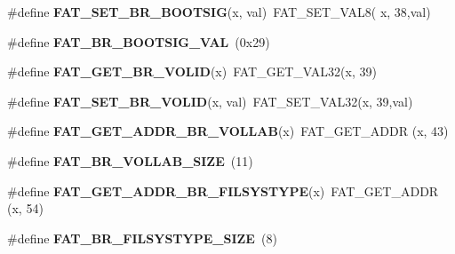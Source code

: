 \begin{DoxyCompactItemize}
\item 
\mbox{\label{group__libfs__dosfs_gab6f7a3cfb82931ecb008051dd56179cf}} 
\#define {\bfseries F\+A\+T\+\_\+\+S\+E\+T\+\_\+\+B\+R\+\_\+\+B\+O\+O\+T\+S\+IG}(x,  val)~F\+A\+T\+\_\+\+S\+E\+T\+\_\+\+V\+A\+L8( x, 38,val)
\item 
\mbox{\label{group__libfs__dosfs_ga1bab3d7f3ca1e4b75de0ccceb5ce33bd}} 
\#define {\bfseries F\+A\+T\+\_\+\+B\+R\+\_\+\+B\+O\+O\+T\+S\+I\+G\+\_\+\+V\+AL}~(0x29)
\item 
\mbox{\label{group__libfs__dosfs_ga62552b72a3937e82137c76fa6a480abf}} 
\#define {\bfseries F\+A\+T\+\_\+\+G\+E\+T\+\_\+\+B\+R\+\_\+\+V\+O\+L\+ID}(x)~F\+A\+T\+\_\+\+G\+E\+T\+\_\+\+V\+A\+L32(x, 39)
\item 
\mbox{\label{group__libfs__dosfs_gab1c126409acc4bde4cf1a77bc445432e}} 
\#define {\bfseries F\+A\+T\+\_\+\+S\+E\+T\+\_\+\+B\+R\+\_\+\+V\+O\+L\+ID}(x,  val)~F\+A\+T\+\_\+\+S\+E\+T\+\_\+\+V\+A\+L32(x, 39,val)
\item 
\mbox{\label{group__libfs__dosfs_ga47729ef14edf1445264f1ac10f80e4ef}} 
\#define {\bfseries F\+A\+T\+\_\+\+G\+E\+T\+\_\+\+A\+D\+D\+R\+\_\+\+B\+R\+\_\+\+V\+O\+L\+L\+AB}(x)~F\+A\+T\+\_\+\+G\+E\+T\+\_\+\+A\+D\+DR (x, 43)
\item 
\mbox{\label{group__libfs__dosfs_ga08748b874293e24d7b4645dc041b1263}} 
\#define {\bfseries F\+A\+T\+\_\+\+B\+R\+\_\+\+V\+O\+L\+L\+A\+B\+\_\+\+S\+I\+ZE}~(11)
\item 
\mbox{\label{group__libfs__dosfs_ga60eb7bc37b554a1e04988a89dea7168f}} 
\#define {\bfseries F\+A\+T\+\_\+\+G\+E\+T\+\_\+\+A\+D\+D\+R\+\_\+\+B\+R\+\_\+\+F\+I\+L\+S\+Y\+S\+T\+Y\+PE}(x)~F\+A\+T\+\_\+\+G\+E\+T\+\_\+\+A\+D\+DR (x, 54)
\item 
\mbox{\label{group__libfs__dosfs_ga3d0b6deb34097aa912637a4eead0bca0}} 
\#define {\bfseries F\+A\+T\+\_\+\+B\+R\+\_\+\+F\+I\+L\+S\+Y\+S\+T\+Y\+P\+E\+\_\+\+S\+I\+ZE}~(8)
\item 
\mbox{\label{group__libfs__dosfs_ga07bed4c79d1017dc46adf62cbf92e9bf}} 

\end{DoxyCompactItemize}
